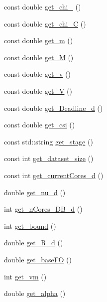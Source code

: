 \begin{DoxyCompactItemize}
\item 
const double \hyperlink{classApplication_a481b3736e133c2a183d3a43f79a44ccf}{get\-\_\-chi\-\_} ()
\item 
const double \hyperlink{classApplication_af1f1a5094b8afa7f9259c15f463b3e72}{get\-\_\-chi\-\_\-\-C} ()
\item 
const double \hyperlink{classApplication_a4e0cd1b869a5a201f3c7d7f2a7313e86}{get\-\_\-m} ()
\item 
const double \hyperlink{classApplication_a7d136a2b9e7759cd7780e85bccfb06d9}{get\-\_\-\-M} ()
\item 
const double \hyperlink{classApplication_a9eed06220d6f5a521c8ff4b4417cd56f}{get\-\_\-v} ()
\item 
const double \hyperlink{classApplication_ac6ee3f52f5049f95109384cdc2990bef}{get\-\_\-\-V} ()
\item 
const double \hyperlink{classApplication_a5fccaf9e0138089067d19f31e0891234}{get\-\_\-\-Deadline\-\_\-d} ()
\item 
const double \hyperlink{classApplication_a6c48b8ebcd884aed4c3153e53e3a4dc1}{get\-\_\-csi} ()
\item 
const std\-::string \hyperlink{classApplication_aa3b7fa5dbc85e1f0518bd1f85fa7205f}{get\-\_\-stage} ()
\item 
const int \hyperlink{classApplication_af8fb87ff4a7f2ba111f2bc6978645f93}{get\-\_\-dataset\-\_\-size} ()
\item 
const int \hyperlink{classApplication_a23f9b3373441f6b7449886a2460271ae}{get\-\_\-current\-Cores\-\_\-d} ()
\item 
double \hyperlink{classApplication_aa6b441c3147aec3aa0192d2e9f76251d}{get\-\_\-nu\-\_\-d} ()
\item 
int \hyperlink{classApplication_a97149e55a340940c15d56be4fb577767}{get\-\_\-n\-Cores\-\_\-\-D\-B\-\_\-d} ()
\item 
int \hyperlink{classApplication_afe686f73d03090e8e179704df91a0b2b}{get\-\_\-bound} ()
\item 
double \hyperlink{classApplication_ad0d83c496de2ca9268bb4d3f743dacac}{get\-\_\-\-R\-\_\-d} ()
\item 
double \hyperlink{classApplication_affaab47de2a18e0dc08c7a6bcd272c5a}{get\-\_\-base\-F\-O} ()
\item 
int \hyperlink{classApplication_a5d59e42d6f67c8f519d4c14df49e82a6}{get\-\_\-vm} ()
\item 
double \hyperlink{classApplication_a0bb182c29dbaf5293a120bdced8d08b6}{get\-\_\-alpha} ()
\item 

\end{DoxyCompactItemize}
